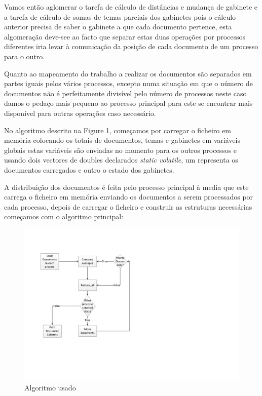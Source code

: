 \documentclass[times, 10pt,twocolumn]{article}
\begin{document}
Vamos então aglomerar o tarefa de cálculo de distâncias e mudança de gabinete e a tarefa de cálculo de somas de temas parciais dos gabinetes pois o cálculo anterior precisa de saber o gabinete a que cada documento pertence, esta algomeração deve-see ao facto que separar estas duas operações por processos diferentes iria levar à comunicação da posição de cada documento de um processo para o outro.

Quanto ao mapeamento do trabalho a realizar os documentos são separados em partes iguais pelos vários processos, excepto numa situação em que o número de documentos não é perfeitamente divisível pelo número de processos neste caso damos o pedaço mais pequeno ao processo principal para este se encontrar mais disponível para outras operações caso necessário.

No algoritmo descrito na Figure 1,  começamos por carregar o ficheiro em memória colocando os totais de documentos, temas e gabinetes em variáveis globais estas variáveis são enviadas no momento para os outros processos e usando dois vectores de doubles declarados \emph{static volatile}, um representa os documentos carregados e outro o estado dos gabinetes.

A distribuição dos documentos é feita pelo processo principal à media que este carrega o ficheiro em memória enviando os documentos a serem processados por cada processo, depois de carregar o ficheiro e construir as estruturas necessárias começamos com o algoritmo principal:

\begin{figure}
\includegraphics[width=\columnwidth]{Algoritmo.pdf}
\caption{Algoritmo usado}
\end{figure}
\end{document}
